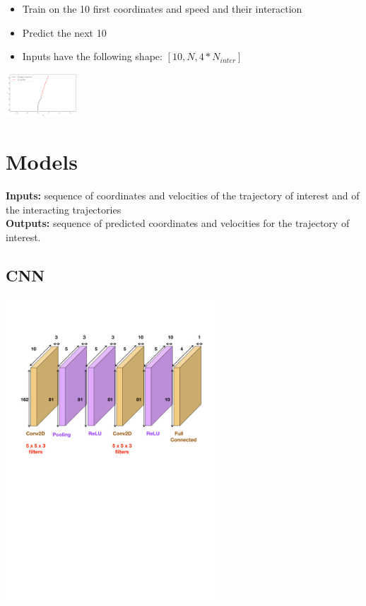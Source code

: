 \documentclass[a0,portrait]{a0poster}
\begin{document}
\begin{multicols}{2}
\begin{itemize}
\item Train on the 10 first coordinates and speed and their interaction
\item Predict the next 10 
\item Inputs have the following shape: $[10,N,4 * N_{inter}]$ 
\end{itemize}

\centerline {\includegraphics[width=0.2\textwidth]{figure/examplepres}}


\section*{Models}
\textbf{Inputs:} sequence of coordinates and velocities of the trajectory of interest and of the interacting trajectories\\
\textbf{Outputs:} sequence of predicted coordinates and velocities for the trajectory of interest.\\

\vspace{1.5cm}

\begin{minipage}[]{0.5\linewidth}
\subsection*{CNN}
\centerline {\includegraphics[width=0.6\textwidth]{figure/CNN}}
\vspace{3cm}
\end{minipage}
\hfill
\begin{minipage}[]{0.5\linewidth}

\end{minipage}
\end{multicols}
\end{document}
